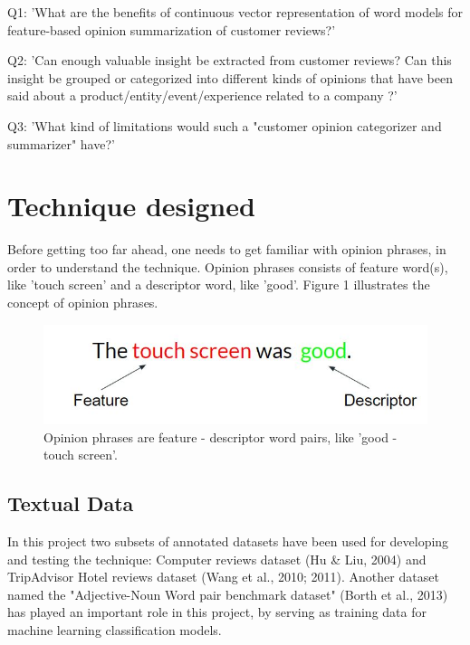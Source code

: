 \documentclass{sig-alternate}
\begin{document}
Q1: 'What are the benefits of continuous vector representation of word models for feature-based opinion summarization of customer reviews?'

Q2: 'Can enough valuable insight be extracted from customer reviews? Can this insight be grouped or categorized into different kinds of opinions that have been said about a product/entity/event/experience related to a company ?'

Q3: 'What kind of limitations would such a "customer opinion categorizer and summarizer" have?'

\section{Technique designed}
Before getting too far ahead, one needs to get familiar with opinion phrases, in order to understand the technique. Opinion phrases consists of feature word(s), like 'touch screen' and a descriptor word, like 'good'. Figure 1 illustrates the concept of opinion phrases. \\
\begin{figure}
\centering
\includegraphics[scale=0.65]{images/FD_words.JPG}
\caption{Opinion phrases are feature - descriptor word pairs, like 'good - touch screen'.}
\end{figure}

\subsection{Textual Data}
In this project two subsets of annotated datasets have been used for developing and testing the technique: Computer reviews dataset (Hu \& Liu, 2004) and TripAdvisor Hotel reviews dataset (Wang et al., 2010; 2011). Another dataset named the "Adjective-Noun Word pair benchmark dataset" (Borth et al., 2013) has played an important role in this project, by serving as training data for machine learning classification models.
\end{document}
